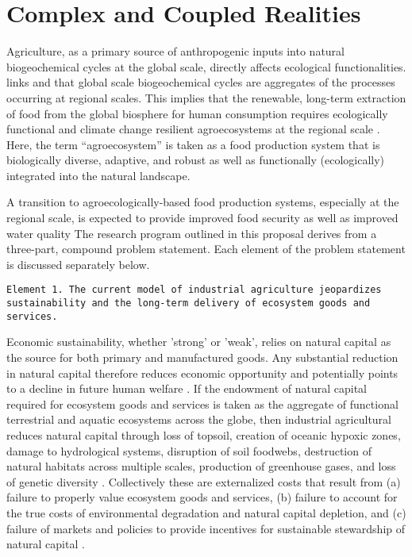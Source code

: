 \section{Complex and Coupled Realities}
Agriculture, as a primary source of anthropogenic inputs into natural biogeochemical cycles at the global scale, directly affects ecological functionalities.  links  and that global scale biogeochemical cycles are aggregates of the processes occurring at regional scales. This implies that the renewable, long-term extraction of food from the global biosphere for human consumption requires ecologically functional and climate change resilient agroecosystems at the regional scale \citep{barnosky_approaching_2012}.  Here, the term \enquote{agroecosystem} is taken as a food production system that is biologically diverse, adaptive, and robust as well as functionally (ecologically) integrated into the natural landscape.
 
 A transition to agroecologically-based food production systems, especially at the regional scale, is expected to provide improved food security as well as improved water quality \citep{godfray_food_2010, schmidhuber_global_2007} 
The research program outlined in this proposal derives from a three-part, compound problem statement. Each element of the problem statement is discussed separately below.\\ 

\begin{sloppypar}
\texttt{Element 1. The current model of industrial agriculture jeopardizes sustainability and the long-term delivery of ecosystem goods and services.}\\
\end{sloppypar}


Economic sustainability, whether 'strong' or 'weak', relies on natural capital as the source for both primary and manufactured goods. Any substantial reduction in natural capital therefore reduces economic opportunity and potentially points to a decline in future human welfare \citep{pearce_blueprint_2000}. If the endowment of natural capital required for ecosystem goods and services is taken as the aggregate of functional terrestrial and aquatic ecosystems across the globe, then industrial agricultural reduces natural capital through loss of topsoil, creation of oceanic hypoxic zones, damage to hydrological systems, disruption of soil foodwebs, destruction of natural habitats across multiple scales, production of greenhouse gases, and loss of genetic diversity \citep{gliessman_agroecology:_2015}. Collectively these are externalized costs that result from (a) failure to properly value ecosystem goods and services, (b) failure to account for the true costs of environmental degradation and natural capital depletion, and (c) failure of markets and policies to provide incentives for sustainable stewardship of natural capital \citep{pearce_blueprint_2000}. \\

